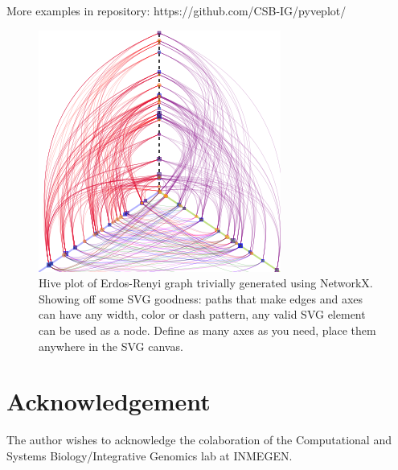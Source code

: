 \documentclass{bioinfo}
\begin{document}
More examples in repository: https://github.com/CSB-IG/pyveplot/


\begin{figure}
  \centerline{\includegraphics{example.png}}
  \caption{Hive plot of Erdos-Renyi graph trivially generated using
    NetworkX. Showing off some SVG goodness: paths that make edges
    and axes can have any width, color or dash pattern, any valid SVG
    element can be used as a node. Define as many axes as you need,
    place them anywhere in the SVG canvas.}
  \label{fig:01}
\end{figure}

\section*{Acknowledgement}
The author wishes to acknowledge the colaboration of the Computational and Systems
Biology/Integrative Genomics lab at INMEGEN.


%
%
%
%

% 
% 
\end{document}
